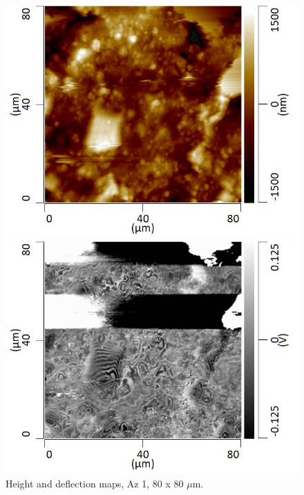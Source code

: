 \begin{figure}[H]
\centering
\begin{minipage}{.45\textwidth}
  \centering
  \includegraphics[width=\linewidth]{Az1_tapping_mode_240521_height_6}
\end{minipage}
\begin{minipage}{.45\textwidth}
  \centering
  \includegraphics[width=\linewidth]{Az1_tapping_mode_240521_def_6}
\end{minipage}
\caption[Height and deflection maps, Az 1]{Height and deflection maps, Az 1, 80 x 80 $\mu$m.}
\label{fig:afm_az1_height_def_3}
\end{figure}

